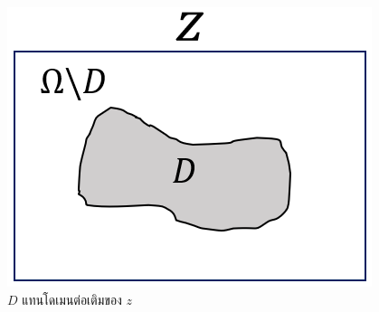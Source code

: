 \begin{figure}[H]
	\centering
	\includegraphics[width=0.375\linewidth]{image/sample-domain.png}
	\caption{$D$ แทนโดเมนต่อเติมของ $z$}
	\label{figure:sample-domain}
\end{figure}